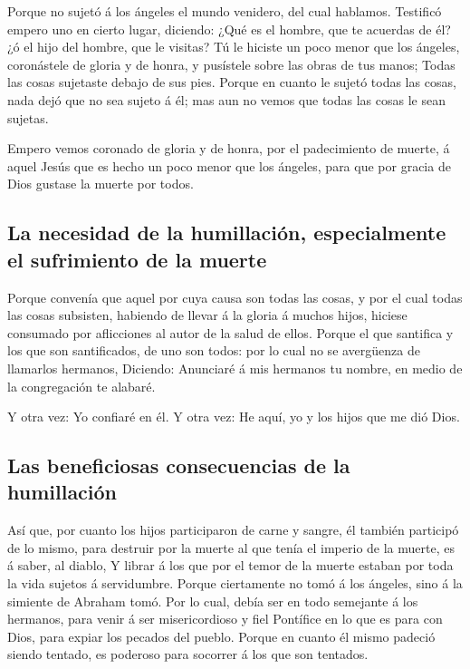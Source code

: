  Porque no sujetó á los ángeles el mundo venidero, del cual
hablamos.  Testificó empero uno en cierto lugar, diciendo:
¿Qué es el hombre, que te acuerdas de él? ¿ó el hijo del hombre, que le
visitas?  Tú le hiciste un poco menor que los ángeles,
coronástele de gloria y de honra, y pusístele sobre las obras de tus
manos;  Todas las cosas sujetaste debajo de sus pies. Porque
en cuanto le sujetó todas las cosas, nada dejó que no sea sujeto á él;
mas aun no vemos que todas las cosas le sean sujetas.

 Empero vemos coronado de gloria y de honra, por el
padecimiento de muerte, á aquel Jesús que es hecho un poco menor que los
ángeles, para que por gracia de Dios gustase la muerte por todos.

\hypertarget{la-necesidad-de-la-humillaciuxf3n-especialmente-el-sufrimiento-de-la-muerte}{%
\subsection{La necesidad de la humillación, especialmente el sufrimiento
de la
muerte}\label{la-necesidad-de-la-humillaciuxf3n-especialmente-el-sufrimiento-de-la-muerte}}

 Porque convenía que aquel por cuya causa son todas las
cosas, y por el cual todas las cosas subsisten, habiendo de llevar á la
gloria á muchos hijos, hiciese consumado por aflicciones al autor de la
salud de ellos.  Porque el que santifica y los que son
santificados, de uno son todos: por lo cual no se avergüenza de
llamarlos hermanos,  Diciendo: Anunciaré á mis hermanos tu
nombre, en medio de la congregación te alabaré.

 Y otra vez: Yo confiaré en él. Y otra vez: He aquí, yo y
los hijos que me dió Dios.

\hypertarget{las-beneficiosas-consecuencias-de-la-humillaciuxf3n}{%
\subsection{Las beneficiosas consecuencias de la
humillación}\label{las-beneficiosas-consecuencias-de-la-humillaciuxf3n}}

 Así que, por cuanto los hijos participaron de carne y
sangre, él también participó de lo mismo, para destruir por la muerte al
que tenía el imperio de la muerte, es á saber, al diablo, 
Y librar á los que por el temor de la muerte estaban por toda la vida
sujetos á servidumbre.  Porque ciertamente no tomó á los
ángeles, sino á la simiente de Abraham tomó.  Por lo cual,
debía ser en todo semejante á los hermanos, para venir á ser
misericordioso y fiel Pontífice en lo que es para con Dios, para expiar
los pecados del pueblo.  Porque en cuanto él mismo padeció
siendo tentado, es poderoso para socorrer á los que son tentados.

